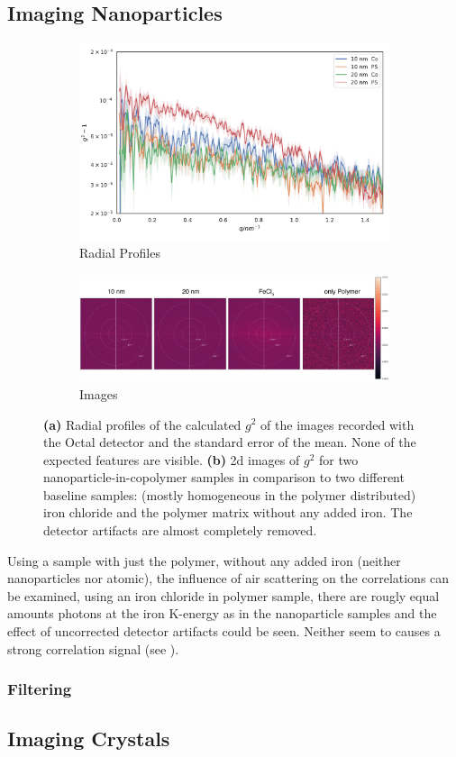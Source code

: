 \subsection{Imaging Nanoparticles}
\begin{figure}
	\centering
	\begin{subfigure}[b]{0.8\textwidth}
		\includegraphics[width=\linewidth]{images/resultnano.pdf}
		\caption{Radial Profiles}
		\label{fig:resnanorad}
	\end{subfigure}
	\begin{subfigure}[b]{0.9\textwidth}
		\includegraphics[width=\linewidth]{images/resultnano2d.pdf}
		\caption{Images}
		\label{fig:resnano2d}
	\end{subfigure}
	\caption[Results Nanoparticles]{\textbf{(a)} Radial profiles of the calculated $g^2$ of the images recorded with the Octal detector and the standard error of the mean. None of the expected features are visible. \textbf{(b)} 2d images of $g^2$ for two nanoparticle-in-copolymer samples in comparison to two different baseline samples: (mostly homogeneous in the polymer distributed) iron chloride and the polymer matrix without any added iron. The detector artifacts are almost completely removed.}
	\label{fig:resnano}
\end{figure}
Using a sample with just the polymer, without any added iron (neither nanoparticles nor atomic), the influence of air scattering on the correlations can be examined, using an iron chloride in polymer sample, there are rougly equal amounts photons at the iron K-energy as in the nanoparticle samples and the effect of uncorrected detector artifacts could be seen. Neither seem to causes a strong correlation signal (see ). 
\subsubsection{Filtering}
\subsection{Imaging Crystals}




